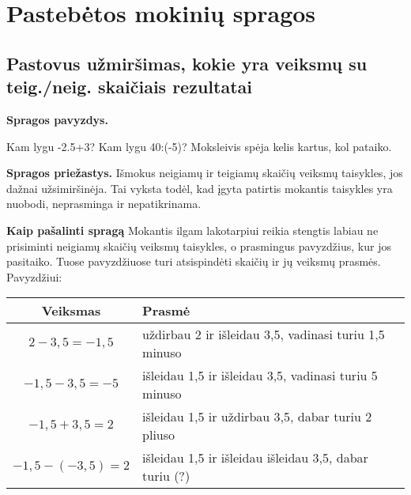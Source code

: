 \documentclass[a4paper]{article}
\begin{document}
\begin{comment}
Mano pamokose moksleiviai dažnai pasižymi taisyklių nemokėjimu arba užmiršimu, todėl pagrindinis dėmesys yra skiriamas ne versti mokinį per trumpą laiką jas išmokti, o nagrinėti, kaip jas galima įsiminti neperkraunant atminties. Nagrinėjimą laikau sėkmingu, jei moksleivis geba susisteminti atmintyje ir įsisavinti matematines taisykles taip, kad jų prisiminimas nekliudytų kontroliniams ir būsimoms matematikos pamokų temoms. Siekiant šio tikslo dažnai prireikia atsiriboti nuo dabartinės moksleivio patirties neatitinkančios mokyklinės mokymo programos ir pereiti prie į programą neįeinančio skaičiaus, kintamojo ir matematinių operacijų iliustravimo bei mintinių eksperimentų, matematinės kalbos tikslinimo. Taip pat moksleivis turi stengtis suvokti, kuriose temose turi spragų, kokia tų spragų prigimtis ir poveikis paskesnėms temoms bei laikytis plano norėdamas tas spragas likviduoti.
\end{comment}
\section*{Pastebėtos mokinių spragos}

\subsection*{Pastovus užmiršimas, kokie yra veiksmų su teig./neig. skaičiais rezultatai}
\textbf{Spragos pavyzdys.} 

Kam lygu -2.5+3? Kam lygu 40:(-5)? Moksleivis spėja kelis kartus, kol pataiko.

\textbf{Spragos priežastys.}
Išmokus neigiamų ir teigiamų skaičių veiksmų taisykles, jos dažnai užsimiršinėja. Tai vyksta todėl, kad įgyta patirtis mokantis taisykles yra nuobodi, neprasminga ir nepatikrinama.

\textbf{Kaip pašalinti spragą} 
Mokantis ilgam lakotarpiui reikia stengtis labiau ne prisiminti neigiamų skaičių veiksmų taisykles, o prasmingus pavyzdžius, kur jos pasitaiko. Tuose pavyzdžiuose turi atsispindėti skaičių ir jų veiksmų prasmės. Pavyzdžiui:

\begin{tabular}{|c|l|}
\hline
\textbf{Veiksmas} & \textbf{Prasmė} \\ \hline 
$2 - 3,5 = -1,5$ & uždirbau 2 ir išleidau 3,5, vadinasi turiu 1,5 minuso\\ \hline
$-1,5 - 3,5 = -5$ & išleidau 1,5 ir išleidau 3,5, vadinasi turiu 5 minuso\\ \hline
$-1,5 + 3,5 = 2$ & išleidau 1,5 ir uždirbau 3,5, dabar turiu 2 pliuso\\ \hline
$-1,5 -(- 3,5) = 2$ & išleidau 1,5 ir  {\color{red}išleidau išleidau} 3,5, dabar turiu (?) \\ \hline
\end{tabular}
\end{document}

